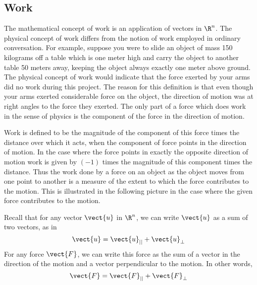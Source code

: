 \subsection{Work}

The mathematical concept of work is an application of vectors in $\R^n$.  The physical concept
of work differs from the notion of work employed in
ordinary conversation. For example, suppose you were to slide an object of mass 150 kilograms
off a table which is one meter high and carry the object to another table 50 meters away, keeping the object always exactly one meter above ground. The physical concept
of work would indicate that the force exerted by your arms did no work
during this project. The reason for this definition is that even
though your arms exerted considerable force on the object, the direction of motion was at right angles to the force they
exerted. The only part of a force which does work in the sense of physics is
the component of the force in the direction of motion.

Work is defined to be the magnitude of the component of
this force times the distance over which it acts, when the 
component of force points in the direction of motion. In the case where the force points in exactly the opposite direction of motion
work is given by $\left( -1\right) $
times the magnitude of this component times the distance.
Thus the work done by a force on an object as
the object moves from one point to another is a measure of the extent to
which the force contributes to the motion. This is illustrated in the
following picture in the case where the given force contributes to the
motion.

\begin{center}
\end{center}

Recall that for any vector $\vect{u}$ in $\R^n$, we can write $\vect{u}$ as a sum
of two vectors, as in
\begin{equation*}
\vect{u} = \vect{u}_{||} + \vect{u}_{\perp}
\end{equation*}
For any force $\vect{F}$,  
we can write this force as the sum of a vector in the direction of the motion and a vector
perpendicular to the motion. In other words,
\begin{equation*}
\vect{F} = \vect{F}_{||} + \vect{F}_{\bot}
\end{equation*}

